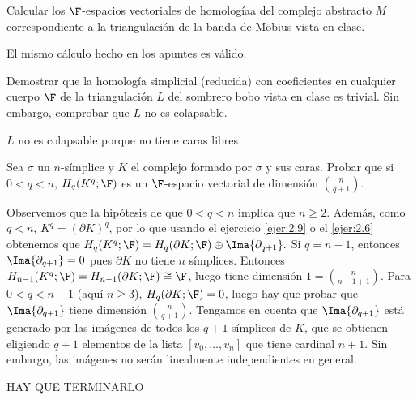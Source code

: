 \documentclass[twoside]{article}
\begin{document}
\newpage

\begin{ejercicio}{2.11}
Calcular los $\F$-espacios vectoriales de homologíaa del complejo abstracto
$M$ correspondiente a la triangulación de la banda de Möbius vista en clase.
\end{ejercicio}
\begin{solucion}
El mismo cálculo hecho en los apuntes es válido.
\end{solucion}

\newpage

\begin{ejercicio}{2.12}
Demostrar que la homología simplicial (reducida) con coeficientes en
cualquier cuerpo $\F$ de la triangulación $L$ del sombrero bobo vista en clase es trivial. Sin
embargo, comprobar que $L$ no es colapsable.
\end{ejercicio}
\begin{solucion}


$L$ no es colapsable porque no tiene caras libres
\end{solucion}

\newpage

\begin{ejercicio}{2.13}
Sea $σ$ un $n$-símplice y $K$ el complejo formado por $σ$ y sus caras. Probar
que si $0 < q < n$, $H_q(K^q; \F)$ es un $\F$-espacio vectorial de dimensión $\binom{n}{q+1}$.
\end{ejercicio}
\begin{solucion}
Observemos que la hipótesis de que $0<q<n$ implica que $n\geq 2$. Además, como $q<n$, $K^q=(\partial K)^q$, por lo que usando el ejercicio \ref{ejer:2.9} o el \ref{ejer:2.6} obtenemos que $H_q(K^q; \F)=H_q(\partial K; \F)\oplus\Ima{\partial_{q+1}}.$ Si $q=n-1$, entonces $\Ima{\partial_{q+1}}=0$ pues $\partial K$ no tiene $n$ símplices. Entonces $H_{n-1}(K^q; \F)=H_{n-1}(\partial K; \F)\cong\F$, luego tiene dimensión $1=\binom{n}{n-1+1}$. Para $0<q<n-1$ (aquí $n\geq 3$), $H_q(\partial K; \F)=0$, luego hay que probar que $\Ima{\partial_{q+1}}$ tiene dimensión $\binom{n}{q+1}$. Tengamos en cuenta que $\Ima{\partial_{q+1}}$ está generado por las imágenes de todos los $q+1$ símplices de $K$, que se obtienen eligiendo $q+1$ elementos de la lista $[v_0,\dots, v_n]$ que tiene cardinal $n+1$. Sin embargo, las imágenes no serán linealmente independientes en general. 


HAY QUE TERMINARLO
\end{solucion}

\newpage
\end{document}
